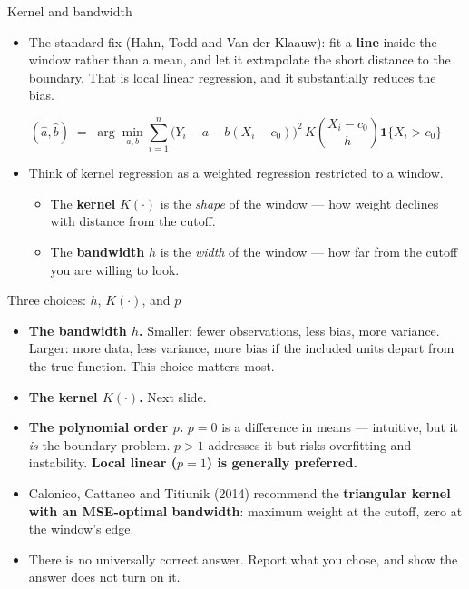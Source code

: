 \documentclass[
  11pt,
  ignorenonframetext,
  aspectratio=169,
]{beamer}
\providecommand{\tightlist}{%
  \setlength{\itemsep}{0pt}\setlength{\parskip}{0pt}}
\begin{document}
\begin{frame}{Kernel and bandwidth}
\protect{}\label{kernel-and-bandwidth}
\begin{itemize}
\tightlist
\item
  The standard fix (Hahn, Todd and Van der Klaauw): fit a \textbf{line}
  inside the window rather than a mean, and let it extrapolate the short
  distance to the boundary. That is local linear regression, and it
  substantially reduces the bias.
\end{itemize}

\[
(\hat a, \hat b) \;=\; \arg\min_{a, b} \sum_{i=1}^n \big(Y_i - a - b(X_i - c_0)\big)^2\,
K\!\left(\frac{X_i - c_0}{h}\right) \mathbf{1}\{X_i > c_0\}
\]

\begin{itemize}
\tightlist
\item
  Think of kernel regression as a weighted regression restricted to a
  window.

  \begin{itemize}
  \tightlist
  \item
    The \textbf{kernel} \(K(\cdot)\) is the \emph{shape} of the window
    --- how weight declines with distance from the cutoff.
  \item
    The \textbf{bandwidth} \(h\) is the \emph{width} of the window ---
    how far from the cutoff you are willing to look.
  \end{itemize}
\end{itemize}
\end{frame}

\begin{frame}{Three choices: \(h\), \(K(\cdot)\), and \(p\)}
\protect{}\label{three-choices-h-kcdot-and-p}
\begin{itemize}
\tightlist
\item
  \textbf{The bandwidth \(h\).} Smaller: fewer observations, less bias,
  more variance. Larger: more data, less variance, more bias if the
  included units depart from the true function. This choice matters
  most.
\item
  \textbf{The kernel \(K(\cdot)\).} Next slide.
\item
  \textbf{The polynomial order \(p\).} \(p = 0\) is a difference in
  means --- intuitive, but it \emph{is} the boundary problem. \(p > 1\)
  addresses it but risks overfitting and instability. \textbf{Local
  linear (\(p = 1\)) is generally preferred.}
\item
  Calonico, Cattaneo and Titiunik (2014) recommend the
  \textbf{triangular kernel with an MSE-optimal bandwidth}: maximum
  weight at the cutoff, zero at the window's edge.
\item
  There is no universally correct answer. Report what you chose, and
  show the answer does not turn on it.
\end{itemize}
\end{frame}
\end{document}
